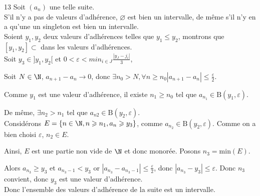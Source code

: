 \begin{correction}{13}
Soit $(a_n)$ une telle suite.\\

S'il n'y a pas de valeurs d'adhérence, $\varnothing$ est bien un intervalle, de même s'il n'y en a qu'une un singleton est bien un intervalle.\\

Soient $y_1,y_2$ deux valeurs d'adhérences telles que $y_1 \leqslant y_2$, montrons que $[y_1,y_2] \subset$ dans les valeurs d'adhérences.\\

Soit $y_3 \in ]y_1, y_2[$ et $0 < \varepsilon < min_{i \in J}\frac{|y_J - j_i|}{3}$,

Soit $N \in \N$, $a_{n+1} - a_n \rightarrow 0$, donc $\exists n_0 > N, \forall n \geqslant n_0 |a_{n+1} - a_n| \leqslant \frac\varepsilon2$.

Comme $y_1$ est une valeur d'adhérence, il existe $n_1 \geqslant n_0$ tel que $a_{n_1} \in \text{B}(y_1, \varepsilon)$.

De même, $\exists n_2 > n_1$ tel que $a_{n2} \in \text{B}(y_2, \varepsilon)$.\\

Considérons $E = \{n \in \N, n \geqslant n_1, a_n \geqslant y_3\}$, comme $a_{n_2} \in \text{B}(y_2,\varepsilon)$. Comme on a bien choisi $\varepsilon$, $n_2 \in E$.

Ainsi, $E$ est une partie non vide de $\N$ et donc monorée. Posons $n_3 = \text{min}(E)$.

Alors $a_{n_3} \geqslant y_3$ et $a_{n_3 - 1} < y_3$ or $|a_{n_3} - a_{n_3 - 1}| \leqslant \frac\varepsilon2$, donc $|a_{n_3} - y_3| \leqslant \varepsilon$. Donc $n_3$ convient, donc $y_3$ est une valeur d'adhérence.\\

Donc l'ensemble des valeurs d'adhérence de la suite est un intervalle. 
\end{correction}

